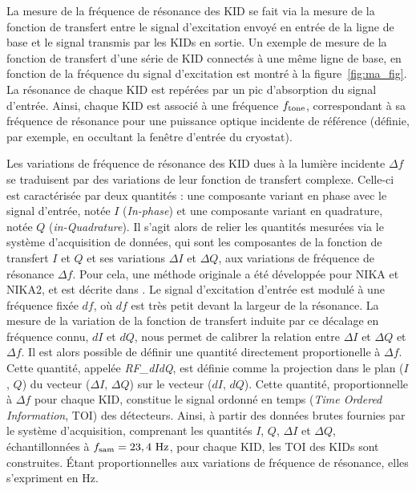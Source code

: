 La mesure de la fréquence de résonance des KID se fait via la mesure
de la fonction de transfert entre le signal d'excitation envoyé en
entrée de la ligne de base et le signal transmis par les KIDs en
sortie. Un exemple de mesure de la fonction de transfert d'une série
de KID connectés à une même ligne de base, en fonction de la fréquence
du signal d'excitation est montré à la figure~\ref{fig:ma_fig}. La
résonance de chaque KID est repérées par un pic d'absorption du signal
d'entrée. Ainsi, chaque KID est associé à une fréquence
$f_{\rm{tone}}$, correspondant à sa fréquence de résonance pour une
puissance optique incidente de référence (définie, par exemple, en
occultant la fenêtre d'entrée du cryostat).

Les variations de fréquence de résonance des KID dues à la lumière
incidente $\Delta f$ se traduisent par des variations de leur fonction
de transfert complexe. Celle-ci est caractérisée par deux
quantités : une composante variant en phase avec le signal d'entrée,
notée $I$ (\emph{In-phase}) et une composante variant en quadrature,
notée $Q$ (\emph{in-Quadrature}). Il s'agit alors de relier les
quantités mesurées via le système d'acquisition de données, qui sont
les composantes de la fonction de transfert $I$ et $Q$ et ses
variations $\Delta I$ et $\Delta Q$, aux variations de fréquence de
résonance $\Delta f$. Pour cela, une méthode originale a
été développée pour NIKA et NIKA2, et est décrite dans
\citet{Calvo2013}.
Le signal d'excitation d'entrée est modulé à une fréquence fixée $df$,
où $df$ est très petit devant la largeur de la résonance. La mesure de
la variation de la fonction de transfert induite par ce décalage en
fréquence connu, $dI$ et $dQ$, nous permet de calibrer la relation
entre $\Delta I$ et $\Delta Q$ et $\Delta f$. Il est alors possible de
définir une quantité directement proportionelle à $\Delta f$. Cette quantité,
appelée \emph{RF\_dIdQ}, est définie comme la projection dans le plan
($I$, $Q$) du vecteur ($\Delta I$, $\Delta Q$) sur le vecteur ($dI$,
$dQ$). Cette quantité, proportionnelle à $\Delta f$ pour chaque KID,
constitue le signal ordonné en temps (\emph{Time Ordered Information},
TOI) des détecteurs. 
Ainsi, à partir des données brutes fournies par le système
d'acquisition, comprenant les quantités $I$, $Q$, $\Delta I$ et
$\Delta Q$, échantillonnées à $f_{\rm{sam}} = 23,4~\rm{Hz}$, pour
chaque KID, les TOI des KIDs sont construites. \'Etant
proportionnelles aux variations de fréquence de résonance, elles
s'expriment en Hz.

